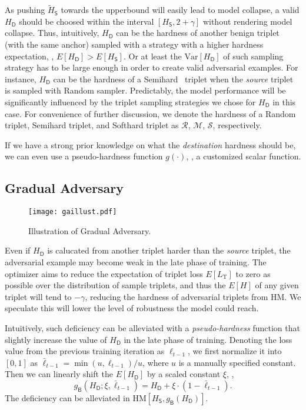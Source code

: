 \documentclass[10pt,twocolumn,letterpaper]{article}
\begin{document}
As pushing $\tilde{H}_\mathsf{S}$ towards the upperbound will easily lead to
model collapse, a valid $H_\mathsf{D}$ should be choosed within the interval
$[H_\mathsf{S},2+\gamma]$ without rendering model collapse.
%
Thus, intuitively, $H_\mathsf{D}$ can be the hardness of another benign triplet
(with the same anchor) sampled with a strategy with a higher hardness
expectation, \ie, $E[H_\mathsf{D}] > E[H_\mathsf{S}]$.
%
Or at least the $\text{Var}[H_\mathsf{D}]$ of such sampling strategy has to be
large enough in order to create valid adversarial examples.
%
For instance, $H_\mathsf{D}$ can be the hardness of a Semihard~\cite{facenet}
triplet when the \emph{source} triplet is sampled with Random sampler.
%
Predictably, the model performance will be significantly influenced by the
triplet sampling strategies we chose for $H_\mathsf{D}$ in this case.
%
For convenience of further discussion, we denote the hardness of a Random
triplet, Semihard triplet, and Softhard triplet as $\mathcal{R}$,
$\mathcal{M}$, $\mathcal{S}$, respectively.

If we have a strong prior knowledge on what the \emph{destination} hardness
should be, we can even use a pseudo-hardness function $g(\cdot)$, \ie, a
customized scalar function.



\subsection{Gradual Adversary}
\label{sec:32}

\begin{figure}
	\texttt{[image: gaillust.pdf]}
	\caption{Illustration of Gradual Adversary.}
	\label{fig:ga}
\end{figure}



Even if $H_\mathsf{D}$ is calucated from another triplet harder than the
\emph{source} triplet, the adversarial example may become weak in the late
phase of training.
%
The optimizer aims to reduce the expectation of triplet
loss $E[L_\text{T}]$ to zero as possible over the distribution of sample triplets, and thus
the $E[H]$ of any given triplet will tend to $-\gamma$, reducing the
hardness of adversarial triplets from HM.
%
We speculate this will lower the level of robustness the model could reach.


Intuitively, such deficiency can be alleviated with a \emph{pseudo-hardness}
function that slightly increase the value of $H_\mathsf{D}$ in the late phase
of training.
%
Denoting the loss value from the previous training iteration as $\ell_{t-1}$,
we first normalize it into $[0,1]$ as $\bar{\ell}_{t-1}=\min(u,\ell_{t-1})/u$,
where $u$ is a manually specified constant.
%
Then we can linearly shift the $E[H_\mathsf{D}]$ by a scaled constant $\xi$,
\ie,
%
\begin{equation}
	g_\mathsf{B}(H_\mathsf{D};\xi,\bar{\ell}_{t-1}) =
	H_\mathsf{D} + \xi \cdot (1-\bar{\ell}_{t-1}).
\end{equation}
%
The deficiency can be alleviated in
$\text{HM}[H_\mathsf{S},g_\mathsf{B}(H_\mathsf{D})]$.
\end{document}
